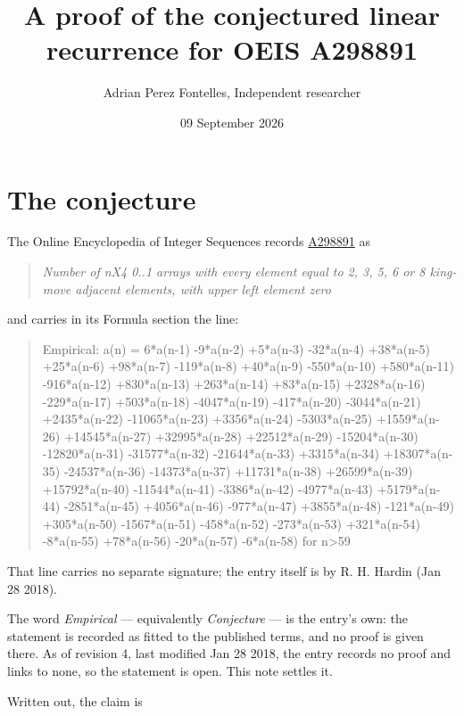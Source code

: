 \documentclass[11pt]{article}
\title{A proof of the conjectured linear recurrence for OEIS A298891}
\author{Adrian Perez Fontelles, Independent researcher}
\date{09 September 2026}
\theoremstyle{definition}
\begin{document}
\maketitle
\section{The conjecture}

The Online Encyclopedia of Integer Sequences records \href{https://oeis.org/A298891}{A298891} as

\begin{quote}\itshape Number of nX4 0..1 arrays with every element equal to 2, 3, 5, 6 or 8 king-move adjacent elements, with upper left element zero\end{quote}

and carries in its Formula section the line:

\begin{quote}\ttfamily Empirical: a(n) = 6*a(n-1) -9*a(n-2) +5*a(n-3) -32*a(n-4) +38*a(n-5) +25*a(n-6) +98*a(n-7) -119*a(n-8) +40*a(n-9) -550*a(n-10) +580*a(n-11) -916*a(n-12) +830*a(n-13) +263*a(n-14) +83*a(n-15) +2328*a(n-16) -229*a(n-17) +503*a(n-18) -4047*a(n-19) -417*a(n-20) -3044*a(n-21) +2435*a(n-22) -11065*a(n-23) +3356*a(n-24) -5303*a(n-25) +1559*a(n-26) +14545*a(n-27) +32995*a(n-28) +22512*a(n-29) -15204*a(n-30) -12820*a(n-31) -31577*a(n-32) -21644*a(n-33) +3315*a(n-34) +18307*a(n-35) -24537*a(n-36) -14373*a(n-37) +11731*a(n-38) +26599*a(n-39) +15792*a(n-40) -11544*a(n-41) -3386*a(n-42) -4977*a(n-43) +5179*a(n-44) -2851*a(n-45) +4056*a(n-46) -977*a(n-47) +3855*a(n-48) -121*a(n-49) +305*a(n-50) -1567*a(n-51) -458*a(n-52) -273*a(n-53) +321*a(n-54) -8*a(n-55) +78*a(n-56) -20*a(n-57) -6*a(n-58) for n>59\end{quote}

That line carries no separate signature; the entry itself is by R. H. Hardin (Jan 28 2018).

The word {\itshape Empirical} --- equivalently {\itshape Conjecture} --- is the entry's own: the statement is recorded as fitted to the published terms, and no proof is given there. As of revision 4, last modified Jan 28 2018, the entry records no proof and links to none, so the statement is open. This note settles it.

Written out, the claim is
\end{document}
